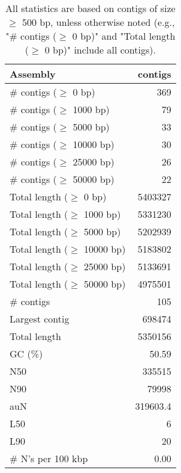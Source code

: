 \documentclass[12pt,a4paper]{article}
\begin{document}
\begin{table}[ht]
\begin{center}
\caption{All statistics are based on contigs of size $\geq$ 500 bp, unless otherwise noted (e.g., "\# contigs ($\geq$ 0 bp)" and "Total length ($\geq$ 0 bp)" include all contigs).}
\begin{tabular}{|l*{1}{|r}|}
\hline
Assembly & contigs \\ \hline
\# contigs ($\geq$ 0 bp) & 369 \\ \hline
\# contigs ($\geq$ 1000 bp) & 79 \\ \hline
\# contigs ($\geq$ 5000 bp) & 33 \\ \hline
\# contigs ($\geq$ 10000 bp) & 30 \\ \hline
\# contigs ($\geq$ 25000 bp) & 26 \\ \hline
\# contigs ($\geq$ 50000 bp) & 22 \\ \hline
Total length ($\geq$ 0 bp) & 5403327 \\ \hline
Total length ($\geq$ 1000 bp) & 5331230 \\ \hline
Total length ($\geq$ 5000 bp) & 5202939 \\ \hline
Total length ($\geq$ 10000 bp) & 5183802 \\ \hline
Total length ($\geq$ 25000 bp) & 5133691 \\ \hline
Total length ($\geq$ 50000 bp) & 4975501 \\ \hline
\# contigs & 105 \\ \hline
Largest contig & 698474 \\ \hline
Total length & 5350156 \\ \hline
GC (\%) & 50.59 \\ \hline
N50 & 335515 \\ \hline
N90 & 79998 \\ \hline
auN & 319603.4 \\ \hline
L50 & 6 \\ \hline
L90 & 20 \\ \hline
\# N's per 100 kbp & 0.00 \\ \hline
\end{tabular}
\end{center}
\end{table}
\end{document}
